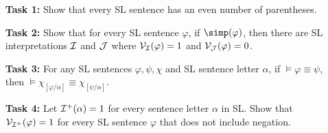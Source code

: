 \documentclass[a4paper, 11pt]{article} %
\begin{document}
\begin{enumerate}
  \item[\bf Task 1:] Show that every SL sentence has an even number of parentheses. 
  \item[\bf Task 2:] Show that for every SL sentence $\varphi$, if $\simp(\varphi)$, then there are SL interpretations $\mathcal{I}$ and $\mathcal{J}$ where $\mathcal{V}_{\mathcal{I}}(\varphi)=1$ and $\mathcal{V}_{\mathcal{J}}(\varphi)=0$. 
  \item[\bf Task 3:] For any SL sentences $\varphi,\psi,\chi$ and SL sentence letter $\alpha$, if $\vDash \varphi \equiv \psi$, then $\vDash \chi_{[\varphi/\alpha]}\equiv\chi_{[\psi/\alpha]}$.
  \item[\bf Task 4:] Let $\mathcal{I}^+(\alpha)=1$ for every sentence letter $\alpha$ in SL. Show that $\mathcal{V}_{\mathcal{I}^+}(\varphi)=1$ for every SL sentence $\varphi$ that does not include negation. 
\end{enumerate}






\end{document}
